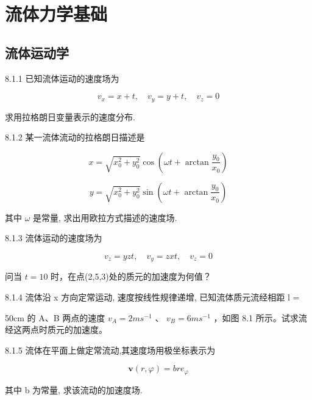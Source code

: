 \chapter{流体力学基础}

\section{流体运动学}

\begin{problem}{8.1.1}
已知流体运动的速度场为

\[
v _ {x} = x + t, \quad v _ {y} = y + t, \quad v _ {z} = 0
\]

求用拉格朗日变量表示的速度分布.
\end{problem}
\clearpage


\begin{problem}{8.1.2}
某一流体流动的拉格朗日描述是

\[
x = \sqrt {x _ {0} ^ {2} + y _ {0} ^ {2}} \cos \left(\omega t + \arctan \frac {y _ {0}}{x _ {0}}\right)
\]

\[
y = \sqrt {x _ {0} ^ {2} + y _ {0} ^ {2}} \sin \left(\omega t + \arctan \frac {y _ {0}}{x _ {0}}\right)
\]

其中 $\omega$ 是常量, 求出用欧拉方式描述的速度场.
\end{problem}
\clearpage


\begin{problem}{8.1.3}
流体运动的速度场为

\[
v _ {z} = y z t, \quad v _ {y} = z x t, \quad v _ {z} = 0
\]

问当 $t = 10$ 时，在点(2,5,3)处的质元的加速度为何值？
\end{problem}
\clearpage


\begin{problem}{8.1.4}
流体沿 x 方向定常运动, 速度按线性规律递增, 已知流体质元流经相距 l =

50cm 的 A、B 两点的速度 $v_{A}=2ms^{-1}$ 、 $v_{B}=6ms^{-1}$ ，如图 8.1 所示。试求流经这两点时质元的加速度。
\begin{center}

\end{center}
\end{problem}
\clearpage


\begin{problem}{8.1.5}
流体在平面上做定常流动,其速度场用极坐标表示为

\[
\boldsymbol {v} (r, \varphi) = b r e _ {\varphi}
\]

其中 b 为常量, 求该流动的加速度场.
\end{problem}
\clearpage


